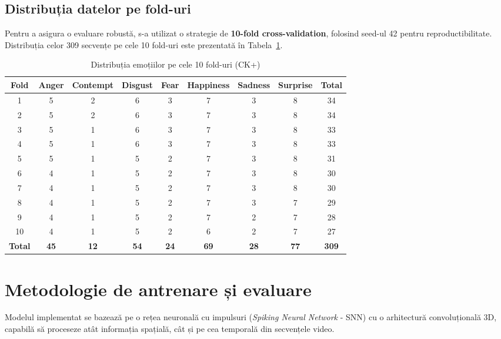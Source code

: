 \subsection*{Distribuția datelor pe fold-uri}
Pentru a asigura o evaluare robustă, s-a utilizat o strategie de \textbf{10-fold cross-validation}, folosind seed-ul 42 pentru reproductibilitate. Distribuția celor 309 secvențe pe cele 10 fold-uri este prezentată în Tabela~\ref{tab:distributie_date}.

\begin{table}[h!]
	\centering
	\caption{Distribuția emoțiilor pe cele 10 fold-uri (CK+)}
	\label{tab:distributie_date}
	\begin{tabular}{@{}ccccccccc@{}}
		\toprule
		\textbf{Fold} & \textbf{Anger} & \textbf{Contempt} & \textbf{Disgust} & \textbf{Fear} & \textbf{Happiness} & \textbf{Sadness} & \textbf{Surprise} & \textbf{Total} \\ \midrule
		1 & 5 & 2 & 6 & 3 & 7 & 3 & 8 & 34 \\
		2 & 5 & 2 & 6 & 3 & 7 & 3 & 8 & 34 \\
		3 & 5 & 1 & 6 & 3 & 7 & 3 & 8 & 33 \\
		4 & 5 & 1 & 6 & 3 & 7 & 3 & 8 & 33 \\
		5 & 5 & 1 & 5 & 2 & 7 & 3 & 8 & 31 \\
		6 & 4 & 1 & 5 & 2 & 7 & 3 & 8 & 30 \\
		7 & 4 & 1 & 5 & 2 & 7 & 3 & 8 & 30 \\
		8 & 4 & 1 & 5 & 2 & 7 & 3 & 7 & 29 \\
		9 & 4 & 1 & 5 & 2 & 7 & 2 & 7 & 28 \\
		10 & 4 & 1 & 5 & 2 & 6 & 2 & 7 & 27 \\ \midrule
		\textbf{Total} & \textbf{45} & \textbf{12} & \textbf{54} & \textbf{24} & \textbf{69} & \textbf{28} & \textbf{77} & \textbf{309} \\ \bottomrule
	\end{tabular}
\end{table}

\section{Metodologie de antrenare și evaluare}

Modelul implementat se bazează pe o rețea neuronală cu impulsuri (\textit{Spiking Neural Network} - SNN) cu o arhitectură convoluțională 3D, capabilă să proceseze atât informația spațială, cât și pe cea temporală din secvențele video.

